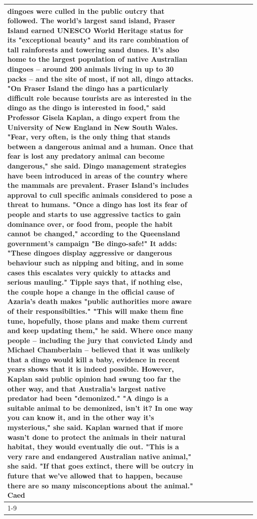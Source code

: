 \begin{table}[H]
\begin{tabular}{lllrlllll}
dingoes were culled in the public outcry that followed. The world's largest sand island, Fraser Island earned UNESCO World Heritage status for its "exceptional beauty" and its rare combination of tall rainforests and towering sand dunes. It's also home to the largest population of native Australian dingoes -- around 200 animals living in up to 30 packs -- and the site of most, if not all, dingo attacks. "On Fraser Island the dingo has a particularly difficult role because tourists are as interested in the dingo as the dingo is interested in food," said Professor Gisela Kaplan, a dingo expert from the University of New England in New South Wales. "Fear, very often, is the only thing that stands between a dangerous animal and a human. Once that fear is lost any predatory animal can become dangerous," she said. Dingo management strategies have been introduced in areas of the country where the mammals are prevalent. Fraser Island's includes approval to cull specific animals considered to pose a threat to humans. "Once a dingo has lost its fear of people and starts to use aggressive tactics to gain dominance over, or food from, people the habit cannot be changed," according to the Queensland government's campaign "Be dingo-safe!" It adds: "These dingoes display aggressive or dangerous behaviour such as nipping and biting, and in some cases this escalates very quickly to attacks and serious mauling." Tipple says that, if nothing else, the couple hope a change in the official cause of Azaria's death makes "public authorities more aware of their responsibilties." "This will make them fine tune, hopefully, those plans and make them current and keep updating them," he said. Where once many people -- including the jury that convicted Lindy and Michael Chamberlain -- believed that it was unlikely that a dingo would kill a baby, evidence in recent years shows that it is indeed possible. However, Kaplan said public opinion had swung too far the other way, and that Australia's largest native predator had been "demonized." "A dingo is a suitable animal to be demonized, isn't it? In one way you can know it, and in the other way it's mysterious," she said. Kaplan warned that if more wasn't done to protect the animals in their natural habitat, they would eventually die out. "This is a very rare and endangered Australian native animal," she said. "If that goes extinct, there will be outcry in future that we've allowed that to happen, because there are so many misconceptions about the animal." Caed \\
\cline{1-9}

\end{tabular}
\end{table}
